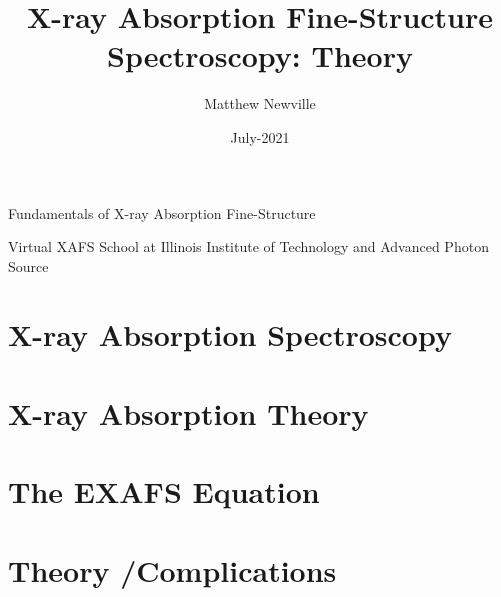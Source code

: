 \documentclass[9pt,aspectratio=1610]{beamer}
\begin{document}
\title[Virtual XAFS School]{X-ray Absorption Fine-Structure Spectroscopy: Theory}
\author[M Newville]{Matthew Newville}
\date{July-2021}



\begin{frame} \titlepage

  \vmm

  \begin{center}
    Fundamentals of X-ray Absorption Fine-Structure
  \end{center}
  
  \vmm

  \begin{cenpage}{60mm}
    Virtual XAFS School at Illinois Institute of Technology and Advanced
  Photon Source
\end{cenpage}
\end{frame}


\section{X-ray Absorption Spectroscopy}

 
 
 
 
 

 \section{X-ray Absorption Theory}

 
  
  
  
  

  \section{The EXAFS Equation}
  
  
  

 \section{Theory /Complications}
 
 
 
 
 
 
 
\end{document}
